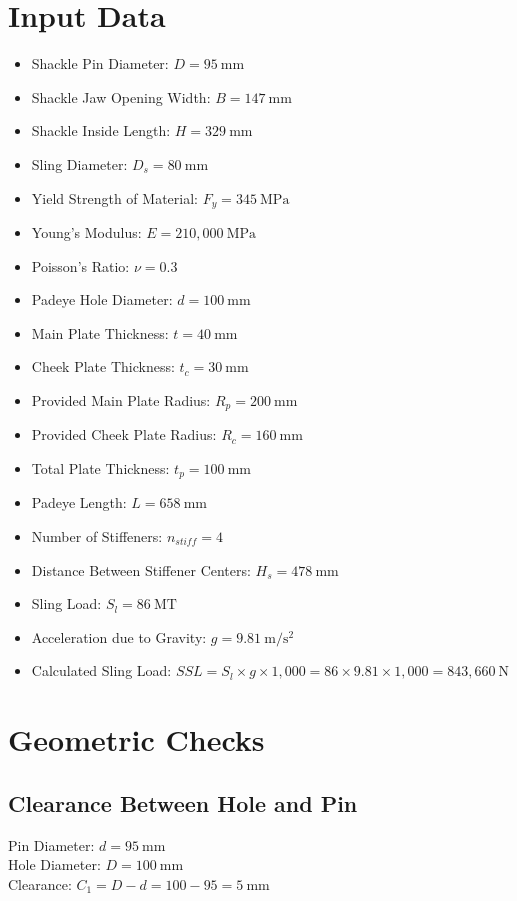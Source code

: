 \documentclass[12pt]{article}
\begin{document}
\section{Input Data}
\begin{itemize}
  \item Shackle Pin Diameter: $D = 95\ \mathrm{mm}$
  \item Shackle Jaw Opening Width: $B = 147\ \mathrm{mm}$
  \item Shackle Inside Length: $H = 329\ \mathrm{mm}$
  \item Sling Diameter: $D_s = 80\ \mathrm{mm}$
  \item Yield Strength of Material: $F_y = 345\ \mathrm{MPa}$
  \item Young's Modulus: $E = 210,000\ \mathrm{MPa}$
  \item Poisson's Ratio: $\nu = 0.3$
  \item Padeye Hole Diameter: $d = 100\ \mathrm{mm}$
  \item Main Plate Thickness: $t = 40\ \mathrm{mm}$
  \item Cheek Plate Thickness: $t_c = 30\ \mathrm{mm}$
  \item Provided Main Plate Radius: $R_p = 200\ \mathrm{mm}$
  \item Provided Cheek Plate Radius: $R_c = 160\ \mathrm{mm}$
  \item Total Plate Thickness: $t_p = 100\ \mathrm{mm}$
  \item Padeye Length: $L = 658\ \mathrm{mm}$
  \item Number of Stiffeners: $n_{stiff} = 4$
  \item Distance Between Stiffener Centers: $H_s = 478\ \mathrm{mm}$
  \item Sling Load: $S_l = 86\ \mathrm{MT}$
  \item Acceleration due to Gravity: $g = 9.81\ \mathrm{m/s^2}$
  \item Calculated Sling Load: $SSL = S_l \times g \times 1,000 = 86 \times 9.81 \times 1,000 = 843,660\ \mathrm{N}$
\end{itemize}

\section{Geometric Checks}
\subsection{Clearance Between Hole and Pin}
Pin Diameter: $d = 95\ \mathrm{mm}$\\
Hole Diameter: $D = 100\ \mathrm{mm}$\\
Clearance: $C_1 = D - d = 100 - 95 = 5\ \mathrm{mm}$
\end{document}
